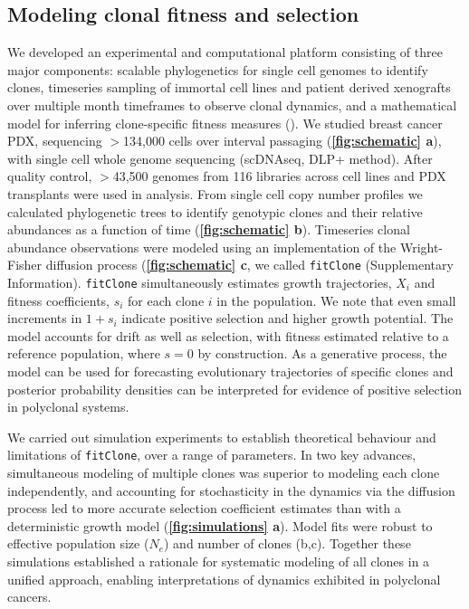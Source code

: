 \subsection{Modeling clonal fitness and selection}
We developed an experimental and computational platform consisting of three major components: scalable phylogenetics for single cell genomes to identify clones, timeseries sampling of immortal cell lines and patient derived xenografts over multiple month timeframes to observe clonal dynamics, and a mathematical model for inferring clone-specific fitness measures (). We studied breast cancer PDX, sequencing $>$134,000 cells over interval passaging (\textbf{\autoref{fig:schematic} a}), with single cell whole genome sequencing\cite{Laks2019-dm} (scDNAseq, DLP+ method). After quality control, $>$43,500 genomes from 116 libraries across cell lines and PDX transplants were used in analysis. From single cell copy number profiles we calculated phylogenetic trees to identify genotypic clones and their relative abundances as a function of time (\textbf{\autoref{fig:schematic} b}).
Timeseries clonal abundance observations were modeled using an implementation of the Wright-Fisher diffusion process  (\textbf{\autoref{fig:schematic} c}, we called \texttt{fitClone} (Supplementary Information). \texttt{fitClone} simultaneously estimates growth trajectories, $X_i$ and fitness coefficients, $s_i$ for each clone $i$ in the population. 
We note that even small increments in $1+s_i$ indicate positive selection and higher growth potential. The model accounts for drift as well as selection, with fitness estimated relative to a reference population, where $s=0$ by construction. As a generative process, the model can be used for forecasting evolutionary trajectories of specific clones and posterior probability densities can be interpreted for evidence of positive selection in polyclonal systems. 

We carried out simulation experiments to establish theoretical behaviour and limitations of \texttt{fitClone}, over a range of parameters.  In two key advances, simultaneous modeling of multiple clones was superior to modeling each clone independently, and accounting for stochasticity in the dynamics via the diffusion process led to more accurate selection coefficient estimates than with a deterministic growth model (\textbf{\autoref{fig:simulations} a}). Model fits were robust to effective population size ($N_e$) and number of clones (b,c). Together these simulations established a rationale for systematic modeling of all clones in a unified approach, enabling  interpretations of dynamics exhibited in polyclonal cancers.



